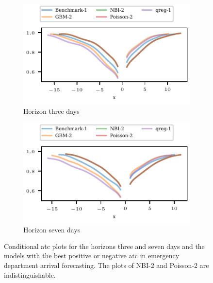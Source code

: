 \documentclass[pdflatex]{sn-jnl}
\theoremstyle{plain}%
\theoremstyle{definition}
\begin{document}
\begin{figure}
    \centering
    \begin{subfigure}[t]{0.48\textwidth}
    \includegraphics{plots/ed_arrival/50_Cond_Prob_lag_3}
    \caption{Horizon three days}
    \end{subfigure}\hfill
    \begin{subfigure}[t]{0.48\textwidth}
    \includegraphics{plots/ed_arrival/50_Cond_Prob_lag_7}
    \caption{Horizon seven days}
    \end{subfigure}
    \caption[Conditional ATC plots for the horizons three and seven days and the models with the best positive or negative \ac{atc} in emergency department arrival forecasting.]{Conditional \ac{atc} plots for the horizons three and seven days and the models with the best positive or negative \ac{atc} in emergency department arrival forecasting. The plots of NBI-2 and Poisson-2 are indistinguishable.}
    \label{fig:app-eda-cond-prob}
\end{figure}
\end{document}
